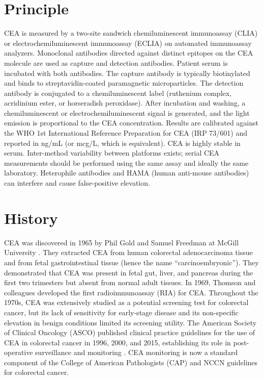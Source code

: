 \section*{Principle}
CEA is measured by a two-site sandwich chemiluminescent immunoassay (CLIA) or electrochemiluminescent immunoassay (ECLIA) on automated immunoassay analyzers. Monoclonal antibodies directed against distinct epitopes on the CEA molecule are used as capture and detection antibodies. Patient serum is incubated with both antibodies. The capture antibody is typically biotinylated and binds to streptavidin-coated paramagnetic microparticles. The detection antibody is conjugated to a chemiluminescent label (ruthenium complex, acridinium ester, or horseradish peroxidase). After incubation and washing, a chemiluminescent or electrochemiluminescent signal is generated, and the light emission is proportional to the CEA concentration. Results are calibrated against the WHO 1st International Reference Preparation for CEA (IRP 73/601) and reported in ng/mL (or mcg/L, which is equivalent). CEA is highly stable in serum. Inter-method variability between platforms exists; serial CEA measurements should be performed using the same assay and ideally the same laboratory. Heterophile antibodies and HAMA (human anti-mouse antibodies) can interfere and cause false-positive elevation.

\section*{History}
CEA was discovered in 1965 by Phil Gold and Samuel Freedman at McGill University \cite{gold1965demonstration}. They extracted CEA from human colorectal adenocarcinoma tissue and from fetal gastrointestinal tissue (hence the name ``carcinoembryonic''). They demonstrated that CEA was present in fetal gut, liver, and pancreas during the first two trimesters but absent from normal adult tissues. In 1969, Thomson and colleagues developed the first radioimmunoassay (RIA) for CEA. Throughout the 1970s, CEA was extensively studied as a potential screening test for colorectal cancer, but its lack of sensitivity for early-stage disease and its non-specific elevation in benign conditions limited its screening utility. The American Society of Clinical Oncology (ASCO) published clinical practice guidelines for the use of CEA in colorectal cancer in 1996, 2000, and 2015, establishing its role in post-operative surveillance and monitoring \cite{locker2006asco}. CEA monitoring is now a standard component of the College of American Pathologists (CAP) and NCCN guidelines for colorectal cancer.

